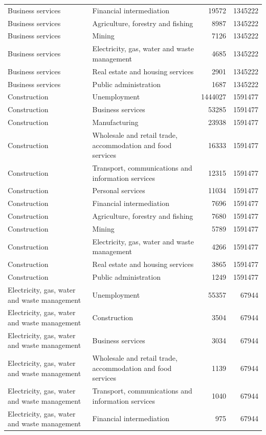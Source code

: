 \begin{longtable}{llrr}
Business services & Financial intermediation & 19572 & 1345222 \\
Business services & Agriculture, forestry and fishing & 8987 & 1345222 \\
Business services & Mining & 7126 & 1345222 \\
Business services & Electricity, gas, water and waste management & 4685 & 1345222 \\
Business services & Real estate and housing services & 2901 & 1345222 \\
Business services & Public administration & 1687 & 1345222 \\
Construction & Unemployment & 1444027 & 1591477 \\
Construction & Business services & 53285 & 1591477 \\
Construction & Manufacturing & 23938 & 1591477 \\
Construction & Wholesale and retail trade, accommodation and food services & 16333 & 1591477 \\
Construction & Transport, communications and information services & 12315 & 1591477 \\
Construction & Personal services & 11034 & 1591477 \\
Construction & Financial intermediation & 7696 & 1591477 \\
Construction & Agriculture, forestry and fishing & 7680 & 1591477 \\
Construction & Mining & 5789 & 1591477 \\
Construction & Electricity, gas, water and waste management & 4266 & 1591477 \\
Construction & Real estate and housing services & 3865 & 1591477 \\
Construction & Public administration & 1249 & 1591477 \\
Electricity, gas, water and waste management & Unemployment & 55357 & 67944 \\
Electricity, gas, water and waste management & Construction & 3504 & 67944 \\
Electricity, gas, water and waste management & Business services & 3034 & 67944 \\
Electricity, gas, water and waste management & Wholesale and retail trade, accommodation and food services & 1139 & 67944 \\
Electricity, gas, water and waste management & Transport, communications and information services & 1040 & 67944 \\
Electricity, gas, water and waste management & Financial intermediation & 975 & 67944 \\

\end{longtable}
